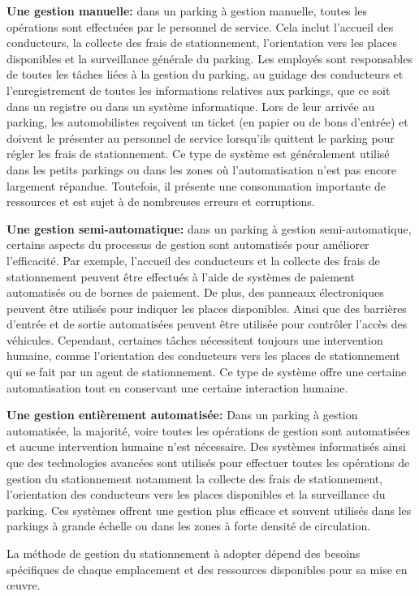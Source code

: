 \begin{outline}

\1  \textbf{Une gestion manuelle: } dans un parking à gestion manuelle, 
toutes les opérations sont effectuées par le personnel de service. Cela inclut l'accueil des conducteurs, la collecte des frais de stationnement, l'orientation vers les places disponibles et la surveillance générale du parking. 
Les employés sont responsables de toutes les tâches liées à la gestion du parking, au guidage des conducteurs et l'enregistrement de toutes les informations relatives aux parkings, que ce soit dans un registre ou dans un système informatique. Lors de leur arrivée au parking, les automobilistes reçoivent un ticket (en papier ou de bons d'entrée) et doivent le présenter au personnel de service lorsqu'ils quittent le parking pour régler les frais de stationnement. Ce type de système est généralement utilisé dans les petits parkings ou dans les zones où l'automatisation n'est pas encore largement répandue. Toutefois, il  présente une consommation importante de ressources et est sujet à de nombreuses erreurs et corruptions.


\1  \textbf{Une gestion semi-automatique: } dans un parking à gestion semi-automatique, certains aspects du processus de gestion sont automatisés pour améliorer l'efficacité. Par exemple, l'accueil des conducteurs et la collecte des frais de stationnement peuvent être effectués à l'aide de systèmes de paiement automatisés ou de bornes de paiement. De plus, des panneaux électroniques peuvent être utilisés pour indiquer les places disponibles. Ainsi que des barrières d'entrée et de sortie automatisées peuvent être utilisée pour contrôler l'accès des véhicules. Cependant, certaines tâches nécessitent toujours une intervention humaine, comme l'orientation des conducteurs vers les places de stationnement qui se fait par un agent de stationnement. Ce type de système offre une certaine automatisation tout en conservant une certaine interaction humaine.


\1 \textbf{Une gestion entièrement automatisée: } Dans un parking à  gestion automatisée, la majorité, voire toutes les opérations de gestion sont automatisées et aucune intervention humaine n'est nécessaire. 
Des systèmes informatisés ainsi que des technologies avancées sont utilisés pour effectuer toutes les opérations de gestion du stationnement notamment la collecte des frais de stationnement, l'orientation des conducteurs vers les places disponibles et la surveillance du parking. Ces systèmes offrent une gestion plus efficace et souvent utilisés dans les parkings à grande échelle ou dans les zones à forte densité de circulation.

\end{outline}
La méthode de gestion du stationnement à adopter dépend des besoins spécifiques de chaque emplacement et des ressources disponibles pour sa mise en œuvre.

